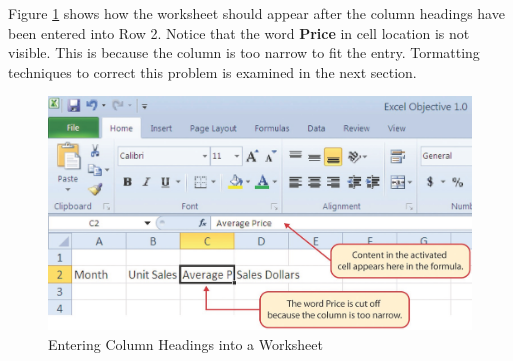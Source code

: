 Figure \ref{01:fig15} shows how the worksheet should appear after the column headings have been entered into Row 2. Notice that the word \textbf{Price} in cell location  is not visible. This is because the column is too narrow to fit the entry. Tormatting techniques to correct this problem is examined in the next section.

\begin{figure}[H]
	\centering
	\includegraphics[width=\maxwidth{.95\linewidth}]{gfx/ch01_fig15}
	\caption{Entering Column Headings into a Worksheet}
	\label{01:fig15}
\end{figure}

